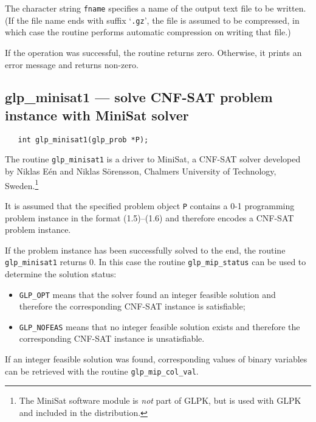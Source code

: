 \documentclass[11pt,draft]{article}
\def\para#1{\noindent{\bf#1}}
\def\synopsis{\para{Synopsis}}
\def\description{\para{Description}}
\def\returns{\para{Returns}}
\begin{document}
The character string \verb|fname| specifies a name of the output text
file to be written. (If the file name ends with suffix `\verb|.gz|',
the file is assumed to be compressed, in which case the routine
performs automatic compression on writing that file.)

\returns

If the operation was successful, the routine returns zero. Otherwise,
it prints an error message and returns non-zero.

\subsection{glp\_minisat1 --- solve CNF-SAT problem instance with
MiniSat solver}

\synopsis

\begin{verbatim}
   int glp_minisat1(glp_prob *P);
\end{verbatim}

\description

The routine \verb|glp_minisat1| is a driver to MiniSat, a CNF-SAT
solver developed by Niklas E\'en and Niklas S\"orensson, Chalmers
University of Technology, Sweden.\footnote{The MiniSat software module
is {\it not} part of GLPK, but is used with GLPK and included in the
distribution.}

\newpage

It is assumed that the specified problem object \verb|P| contains
a 0-1 programming problem instance in the format (1.5)--(1.6) and
therefore encodes a CNF-SAT problem instance.

If the problem instance has been successfully solved to the end, the
routine \verb|glp_minisat1| returns 0. In this case the routine
\verb|glp_mip_status| can be used to determine the solution status:

\begin{itemize}
\item {\tt GLP\_OPT} means that the solver found an integer feasible
solution and therefore the corresponding CNF-SAT instance is
satisfiable;

\item {\tt GLP\_NOFEAS} means that no integer feasible solution exists
and therefore the corresponding CNF-SAT instance is unsatisfiable.
\end{itemize}

If an integer feasible solution was found, corresponding values of
binary variables can be retrieved with the routine
\verb|glp_mip_col_val|.
\end{document}
